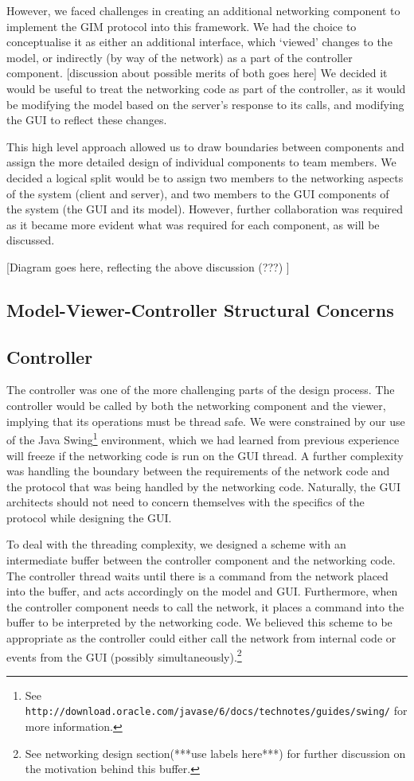 However, we faced challenges in creating an additional networking component to implement the GIM protocol into this framework. We had the choice to conceptualise it as either an additional interface, which `viewed' changes to the model, or indirectly (by way of the network) as a part of the controller component. [discussion about possible merits of both goes here] We decided it would be useful to treat the networking code as part of the controller, as it would be modifying the model based on the server's response to its calls, and modifying the GUI to reflect these changes.
	
This high level approach allowed us to draw boundaries between components and assign the more detailed design of individual components to team members. We decided a logical split would be to assign two members to the networking aspects of the system (client and server), and two members to the GUI components of the system (the GUI and its model). However, further collaboration was required as it became more evident what was required for each component, as will be discussed.

[Diagram goes here, reflecting the above discussion (???) ]

\subsection {Model-Viewer-Controller Structural Concerns}

\subsection {Controller}

The controller was one of the more challenging parts of the design process. The controller would be called by both the networking component and the viewer, implying that its operations must be thread safe. We were constrained by our use of the Java Swing\footnote{See \texttt{http://download.oracle.com/javase/6/docs/technotes/guides/swing/} for more information.} environment, which we had learned from previous experience will freeze if the networking code is run on the GUI thread. A further complexity was handling the boundary between the requirements of the network code and the protocol that was being handled by the networking code. Naturally, the GUI architects should not need to concern themselves with the specifics of the protocol while designing the GUI. 

To deal with the threading complexity, we designed a scheme with an intermediate buffer between the controller component and the networking code. The controller thread waits until there is a command from the network placed into the buffer, and acts accordingly on the model and GUI. Furthermore, when the controller component needs to call the network, it places a command into the buffer to be interpreted by the networking code. We believed this scheme to be appropriate as the controller could either call the network from internal code or events from the GUI (possibly simultaneously).\footnote{See networking design section(***use labels here***) for further discussion on the motivation behind this buffer.}

